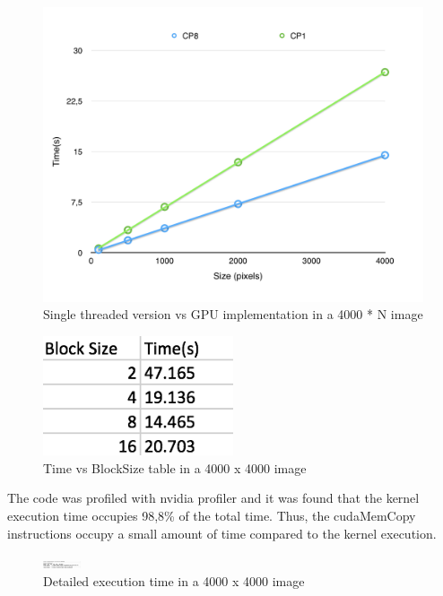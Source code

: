 \documentclass[a4paper,10pt]{article}
\begin{document}
\begin{figure}[H]
\centering
\includegraphics[width=1\textwidth]{figures/w4_cp1Vscp8}
\caption{Single threaded version vs GPU implementation in a 4000 * N image}
\label{fig:pca_type}
\end{figure}

\begin{figure}[H]
\centering
\includegraphics[width=0.5\textwidth]{figures/w4_blockSizeTable}
\caption{Time vs BlockSize table in a 4000 x 4000 image}
\label{fig:pca_type}
\end{figure}

The code was profiled with nvidia profiler and it was found that the kernel execution time occupies 98,8\% of the total time. Thus, the cudaMemCopy instructions occupy a small amount of time compared to the kernel execution. 

\begin{figure}[H]
\centering
\includegraphics[width=0.1\textwidth]{figures/w4_timing}
\caption{Detailed execution time in a 4000 x 4000 image}
\label{fig:pca_type}
\end{figure}
\end{document}
